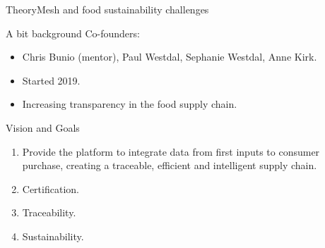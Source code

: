 \documentclass[t,9pt,aspectratio=169]{beamer}
\newcommand{\myred}[1]{{\color{red}#1}}
\newcommand{\mydarkgreen}[1]{{\color{JungleGreen}#1}}
\begin{document}
\begin{frame}{TheoryMesh and food sustainability challenges}
 \begin{block}{A bit background}
	Co-founders:
	\begin{itemize}
		\item Chris Bunio (mentor), Paul Westdal, Sephanie Westdal, Anne Kirk.
		\item Started 2019.
		\item Increasing transparency in the food supply chain.		
	\end{itemize}
 \end{block}

 \begin{block}{Vision and Goals}
	\begin{enumerate}
		\item Provide the platform to integrate data from first inputs to consumer purchase, creating a
		traceable, efficient and intelligent supply chain.
		\item Certification.
		\item Traceability.
		\item Sustainability.

	\end{enumerate}
 \end{block}
 








 
\end{frame}
\end{document}

